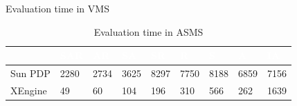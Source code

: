 \begin{table}[t]
\caption{Evaluation time in VMS}
\label{table:VMSeval}
\vspace{5 mm}
\centering
\begin{tabular}{|l|l|l|l|l|l|l|l|l|}   
\hline  \rowcolor{black} \scriptsize \bf \textcolor {white}{}
& \scriptsize \bf \textcolor {white}{SAR}
& \scriptsize \bf \textcolor {white}{AR}
& \scriptsize \bf \textcolor  {white}{SA}
& \scriptsize \bf \textcolor  {white}{SR}
& \scriptsize \bf \textcolor  {white}{R}
& \scriptsize \bf \textcolor  {white}{S} 
& \scriptsize \bf \textcolor  {white}{A}
& \scriptsize \bf \textcolor {white}{IA}\\ \hline
\scriptsize  {Sun PDP  }
& \scriptsize  {2280}
& \scriptsize {2734}
& \scriptsize {3625}
& \scriptsize {8297}
& \scriptsize {7750}
& \scriptsize {8188}
& \scriptsize {6859}
& \scriptsize {7156}
  \\ \hline
\scriptsize  {XEngine}
& \scriptsize  {49}
& \scriptsize {60}
& \scriptsize {104}
& \scriptsize {196}
& \scriptsize {310}
& \scriptsize {566}
& \scriptsize {262}
& \scriptsize {1639}
  \\ \hline
\end{tabular}
\caption{Evaluation time in ASMS}
\label{table:ASMSeval}
\end{table}
